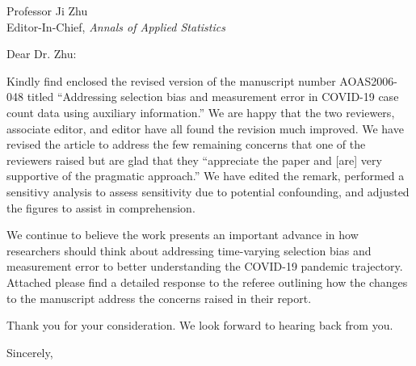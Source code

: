 \documentclass[11pt]{letter} %
\begin{document}

\begin{letter}{Professor Ji Zhu \\
    Editor-In-Chief, {\em Annals of Applied Statistics}
         }


\signature{Walter Dempsey\\
University of Michigan \\
Department of Biostatistics\\
M4057 SPH II \\
1415 Washington Heights \\
wdem@umich.edu} %


\date\today

\opening{Dear Dr. Zhu:}

Kindly find enclosed the revised version of the manuscript number AOAS2006-048 titled ``Addressing selection bias and measurement error in COVID-19 case count data using auxiliary information.''  We are happy that the two reviewers, associate editor, and editor have all found the revision much improved. We have revised the article to address the few remaining concerns that one of the reviewers raised but are glad that they ``appreciate the paper and [are] very supportive of the pragmatic approach.''  We have edited the remark, performed a sensitivy analysis to assess sensitivity due to potential confounding, and adjusted the figures to assist in comprehension.

We continue to believe the work presents an important advance in how researchers should think about addressing time-varying selection bias and measurement error to better understanding the COVID-19 pandemic trajectory. Attached please find a detailed response to the referee outlining how the changes to the manuscript address the concerns raised in their report.

Thank you for your consideration. We look forward to hearing back from you.

\closing{Sincerely,}


\end{letter}
\end{document}
